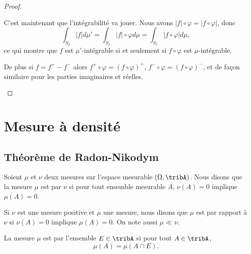 \begin{proof}
\begin{subproof}
		C'est maintenant que l'intégrabilité va jouer. Nous avons \( | f |\circ\varphi=| f\circ\varphi |\), donc
		\begin{equation}
			\int_{S_2}| f |d\mu'=\int_{S_1}| f |\circ\varphi d\mu=\int_{S_1}| f\circ \varphi |d\mu,
		\end{equation}
		ce qui montre que \( f\) est \( \mu'\)-intégrable si et seulement si \( f\circ\varphi\) est \( \mu\)-intégrable.

		De plus si \(f=f^+-f^- \) alors \( f^+\circ\varphi=(f\circ\varphi)^+\), \( f^-\circ\varphi=(f\circ\varphi)^-\), et de façon similaire pour les parties imaginaires et réelles.
	\end{subproof}
\end{proof}

\section{Mesure à densité}

\subsection{Théorème de Radon-Nikodym}

\begin{definition}
	Soient \( \mu\) et \( \nu\) deux mesures sur l'espace mesurable \( (\Omega,\tribA)\). Nous disons que la mesure \( \mu\) est  par \( \nu\) si pour tout ensemble mesurable \( A\), \( \nu(A)=0\) implique \( \mu(A)=0\).

	Si \( \nu\) est une mesure positive et \( \mu\) une mesure, nous disons que \( \mu\) est  par rapport à \( \nu\) si \( \nu(A)=0\) implique \( \mu(A)=0\). On note aussi \( \mu\ll\nu\).
\end{definition}

La mesure \( \mu\) est  par l'ensemble \( E\in\tribA\) si pour tout \( A\in\tribA\),
\begin{equation}
	\mu(A)=\mu(A\cap E).
\end{equation}

